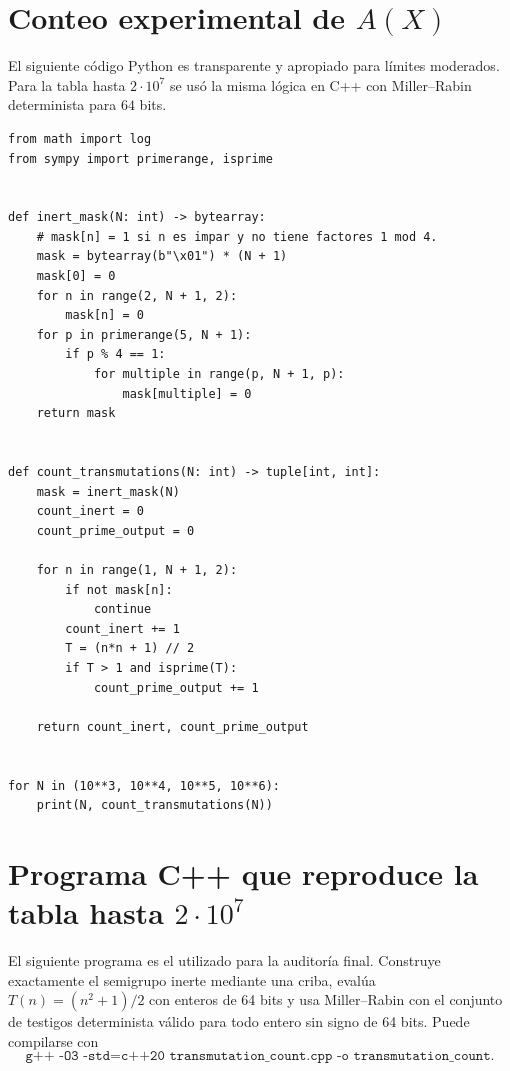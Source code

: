 \documentclass[11pt,a4paper,openany]{report}
\begin{document}
\section{Conteo experimental de \(A(X)\)}

El siguiente código Python es transparente y apropiado para límites moderados. Para la tabla hasta \(2\cdot10^7\) se usó la misma lógica en C++ con Miller--Rabin determinista para \(64\) bits.

\begin{lstlisting}[caption={Conteo de entradas inertes con salida prima.},label={lst:count}]
from math import log
from sympy import primerange, isprime


def inert_mask(N: int) -> bytearray:
    # mask[n] = 1 si n es impar y no tiene factores 1 mod 4.
    mask = bytearray(b"\x01") * (N + 1)
    mask[0] = 0
    for n in range(2, N + 1, 2):
        mask[n] = 0
    for p in primerange(5, N + 1):
        if p % 4 == 1:
            for multiple in range(p, N + 1, p):
                mask[multiple] = 0
    return mask


def count_transmutations(N: int) -> tuple[int, int]:
    mask = inert_mask(N)
    count_inert = 0
    count_prime_output = 0

    for n in range(1, N + 1, 2):
        if not mask[n]:
            continue
        count_inert += 1
        T = (n*n + 1) // 2
        if T > 1 and isprime(T):
            count_prime_output += 1

    return count_inert, count_prime_output


for N in (10**3, 10**4, 10**5, 10**6):
    print(N, count_transmutations(N))
\end{lstlisting}

\section{Programa C++ que reproduce la tabla hasta \(2\cdot10^7\)}

El siguiente programa es el utilizado para la auditoría final. Construye exactamente el semigrupo inerte mediante una criba, evalúa \(T(n)=(n^2+1)/2\) con enteros de 64 bits y usa Miller--Rabin con el conjunto de testigos determinista válido para todo entero sin signo de 64 bits. Puede compilarse con
\[
 \texttt{g++ -O3 -std=c++20 transmutation\_count.cpp -o transmutation\_count}.
\]
\end{document}
